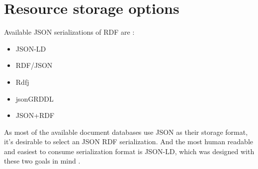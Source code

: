 


\section{Resource storage options}
Available JSON serializations of RDF are \cite{onlineW3CRdfSyntax}:
\begin{itemize}
	\item JSON-LD
	\item RDF/JSON
	\item Rdfj
	\item jsonGRDDL
	\item JSON+RDF
\end{itemize}
As most of the available document databases use JSON as their storage format, it's desirable to select an JSON RDF serialization. And the most human readable and easiest to consume serialization format is JSON-LD, which was designed with these two goals in mind \cite{onlineJsonLdDesignGoals}. 

